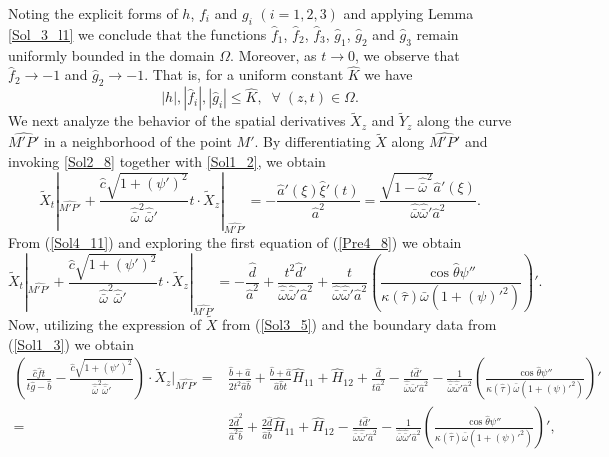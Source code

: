 \documentclass[3p,11pt]{elsarticle}
\numberwithin{equation}{section}
\begin{document}
Noting the explicit forms of $h$, $f_i$ and $g_i$ $(i=1,2,3)$ and applying Lemma \ref{Sol_3_l1} we conclude that the functions $\hat f_1$, $\hat f_2$, $\hat f_3$, $\hat g_1$, $\hat g_2$ and $\hat g_3$ remain uniformly bounded in the domain $\Omega$. Moreover, as $t \to 0$, we observe that $\hat f_2 \to -1$ and $\hat g_2 \to -1$. That is, for a uniform constant $\hat K$ we have
\begin{equation*}\label{Sol4_10}
    |h|,|\hat f_i|,|\hat g_i| \leq \hat K, \; \; \forall \; (z,t)\in \Omega.
\end{equation*}
We next analyze the behavior of the spatial derivatives $\widetilde X_z$ and $\widetilde Y_z$ along the curve $\widehat{M'P'}$ in a neighborhood of the point $M'$. By differentiating $\widetilde X$ along $\widehat{M'P'}$ and invoking \eqref{Sol2_8} together with \eqref{Sol1_2}, we obtain
\begin{equation}\label{Sol4_11}
    \widetilde X_t|_{\widehat{M'P'}}+\frac{\hat c \sqrt{1+(\psi')^2}}{\hat{\bar\omega}^2\hat{\bar\omega}'}t\cdot\widetilde X_z|_{\widehat{M'P'}}=-\frac{\hat a'(\xi)\hat\xi'(t)}{\hat{a}^2}=\frac{\sqrt{1-\hat{\bar\omega}^2}\hat a'(\xi)}{\hat{\bar\omega}\hat{\bar\omega}' \hat{a}^2}.
\end{equation}
From (\ref{Sol4_11}) and exploring the first equation of (\ref{Pre4_8}) we obtain
\begin{equation*}\label{Sol4_12}
    \widetilde X_t|_{\widehat{M'P'}}+\frac{\hat c \sqrt{1+(\psi')^2}}{\hat{\bar\omega}^2\hat{\bar\omega}'}t\cdot\widetilde X_z|_{\widehat{M'P'}}=-\frac{\hat d}{\hat a^2}+\frac{t^2\hat d'}{\hat {\bar\omega}\hat{\bar\omega}'\hat a^2}+\frac{t}{\hat {\bar\omega}\hat{\bar\omega}'\hat a^2} \left(\frac{\cos\hat\theta\psi''}{\kappa(\hat\tau)\bar\omega(1+(\psi)'^2)} \right)'.
\end{equation*}
Now, utilizing the expression of $\widetilde X$ from (\ref{Sol3_5}) and the boundary data from (\ref{Sol1_3}) we obtain
\begin{equation*}\label{Sol4_13}
    \begin{split}
        \left(\frac{\hat c \hat ft}{t\hat g-\hat b}-\frac{\hat c \sqrt{1+(\psi')^2}}{\hat{\bar\omega}^2\hat{\bar\omega}'}\right)\cdot\tilde X_z|_{\widehat{M'P'}} =& \frac{\hat b+\hat a}{2t^2\hat a\hat b}+\frac{\hat b+\hat a}{\hat a\hat bt}\hat H_{11}+\hat H_{12}
        +\frac{\hat d}{t\hat a^2}-\frac{t\hat d'}{\hat {\bar\omega}\hat{\bar\omega}'\hat a^2}-\frac{1}{\hat {\bar\omega}\hat{\bar\omega}'\hat a^2} \left(\frac{\cos\hat\theta\psi''}{\kappa(\hat\tau)\bar\omega(1+(\psi)'^2)} \right)'\\
        =& \frac{2\hat d^2}{\hat a^2\hat b}+\frac{2\hat d}{\hat a\hat b}\hat H_{11}+\hat H_{12}-\frac{t\hat d'}{\hat{\bar\omega}\hat{\bar\omega}'\hat a^2}-\frac{1}{\hat {\bar\omega}\hat{\bar\omega}'\hat a^2} \left(\frac{\cos\hat\theta\psi''}{\kappa(\hat\tau)\bar\omega(1+(\psi)'^2)} \right)',
    \end{split}
\end{equation*}
\end{document}
